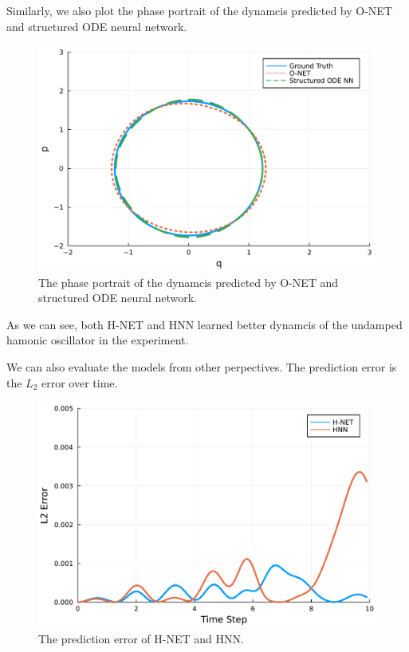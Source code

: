 \documentclass[
	parskip, 			   %
	twoside, 			   %
	DIV=14, 			   %
	BCOR=15.0mm, 		   %
	headsepline, 		   %
	open=right, 		   %
	captions=tableheading, %
	bibliography=totoc,    %
	numbers=noenddot       %
]{scrreprt}
\begin{document}
Similarly, we also plot the phase portrait of the dynamcis predicted by O-NET and structured ODE neural network.

\clearpage
\begin{figure}[h!]
    \centering
    \includegraphics[scale=0.5]{figures/phase_portrait_O_NET_and_structured_ODE_NN.pdf}
    \caption{The phase portrait of the dynamcis predicted by O-NET and structured ODE neural network.}
    \label{fig:phase_portrait_O_NET_and_structured_ODE_NN}
\end{figure}

As we can see, both H-NET and HNN learned better dynamcis of the undamped hamonic oscillator in the experiment.

We can also evaluate the models from other perpectives. The prediction error is the $L_{2}$ error over time.

\begin{figure}[h!]
    \centering
    \includegraphics[scale=0.5]{figures/prediction_error_H_NET_and_HNN.pdf}
    \caption{The prediction error of H-NET and HNN.}
    \label{fig:prediction_error_H_NET_and_HNN}
\end{figure}
\end{document}
